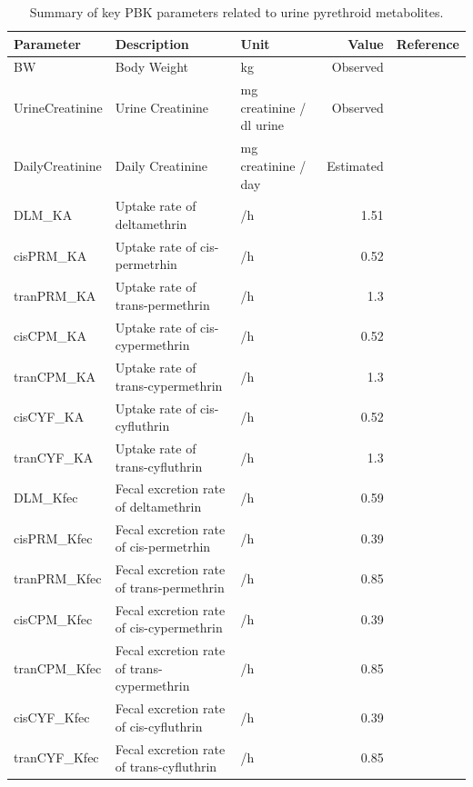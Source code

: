 \begin{table}[h]
\begin{adjustwidth}{-4cm}{}
\caption{Summary of key PBK parameters related to urine pyrethroid metabolites.}
\label{tab:tabs3}
\centering
\small
\begin{tabular}{lllrr}
\toprule
Parameter & Description & Unit & Value & Reference\\
\midrule
BW & Body Weight & kg & Observed & \\
UrineCreatinine & Urine Creatinine & mg creatinine / dl urine & Observed & \\
DailyCreatinine & Daily Creatinine & mg creatinine / day & Estimated & \cite{stanfield2022bayesian}\\
DLM\_KA & Uptake rate of deltamethrin & /h & 1.51 & \cite{quindroit2019estimating}\\
cisPRM\_KA & Uptake rate of cis-permetrhin & /h & 0.52 & \cite{quindroit2019estimating}\\
tranPRM\_KA & Uptake rate of trans-permethrin & /h & 1.3 & \cite{quindroit2019estimating}\\
cisCPM\_KA & Uptake rate of cis-cypermethrin & /h & 0.52 & \cite{quindroit2019estimating}\\
tranCPM\_KA & Uptake rate of trans-cypermethrin & /h & 1.3 & \cite{quindroit2019estimating}\\
cisCYF\_KA & Uptake rate of cis-cyfluthrin & /h & 0.52 & \cite{quindroit2019estimating}\\
tranCYF\_KA & Uptake rate of trans-cyfluthrin & /h & 1.3 & \cite{quindroit2019estimating}\\
DLM\_Kfec & Fecal excretion rate of deltamethrin & /h & 0.59 & \cite{quindroit2019estimating}\\
cisPRM\_Kfec & Fecal excretion  rate of cis-permetrhin & /h & 0.39 & \cite{quindroit2019estimating}\\
tranPRM\_Kfec & Fecal excretion  rate of trans-permethrin & /h & 0.85 & \cite{quindroit2019estimating}\\
cisCPM\_Kfec & Fecal excretion rate of cis-cypermethrin & /h & 0.39 & \cite{quindroit2019estimating}\\
tranCPM\_Kfec & Fecal excretion rate of trans-cypermethrin & /h & 0.85 & \cite{quindroit2019estimating}\\
cisCYF\_Kfec & Fecal excretion  rate of cis-cyfluthrin & /h & 0.39 & \cite{quindroit2019estimating}\\
tranCYF\_Kfec & Fecal excretion  rate of trans-cyfluthrin & /h & 0.85 & \cite{quindroit2019estimating}\\

\end{tabular}
\end{adjustwidth}
\end{table}

